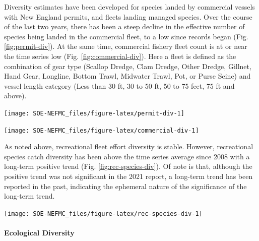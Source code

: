 \documentclass[
  10pt,
]{article}
\let\origfigure\figure
\let\endorigfigure\endfigure
\renewenvironment{figure}[1][2] {
    \expandafter\origfigure\expandafter[H]
} {
    \endorigfigure
}
\begin{document}
Diversity estimates have been developed for species landed by commercial vessels with New England permits, and fleets landing managed species. Over the course of the last two years, there has been a steep decline in the effective number of species being landed in the commercial fleet, to a low since records began (Fig. \ref{fig:permit-div}). At the same time, commercial fishery fleet count is at or near the time series low (Fig. \ref{fig:commercial-div}). Here a fleet is defined as the combination of gear type (Scallop Dredge, Clam Dredge, Other Dredge, Gillnet, Hand Gear, Longline, Bottom Trawl, Midwater Trawl, Pot, or Purse Seine) and vessel length category (Less than 30 ft, 30 to 50 ft, 50 to 75 feet, 75 ft and above).

\begin{figure}

{\centering \texttt{[image: SOE-NEFMC\_files/figure-latex/permit-div-1]} 

}

\caption{Species revenue diversity in New England.}\label{fig:permit-div}
\end{figure}

\begin{figure}

{\centering \texttt{[image: SOE-NEFMC\_files/figure-latex/commercial-div-1]} 

}

\caption{Commercial fleet count and diversity in New England.}\label{fig:commercial-div}
\end{figure}

As noted \protect\hyperlink{recreational-opportunities}{above}, recreational fleet effort diversity is stable. However, recreational species catch diversity has been above the time series average since 2008 with a long-term positive trend (Fig. \ref{fig:rec-species-div}). Of note is that, although the positive trend was not significant in the 2021 report, a long-term trend has been reported in the past, indicating the ephemeral nature of the significance of the long-term trend.

\begin{figure}

{\centering \texttt{[image: SOE-NEFMC\_files/figure-latex/rec-species-div-1]} 

}

\caption{Diversity of recreational catch in New England.}\label{fig:rec-species-div}
\end{figure}

\hypertarget{ecological-diversity}{%
\paragraph{Ecological Diversity}\label{ecological-diversity}}
\end{document}
